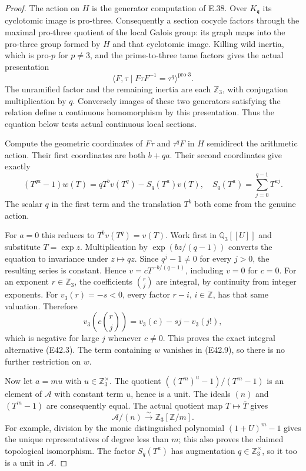 \begin{proof}
The action on $H$ is the generator computation of E.38.
Over $K_{\mathfrak q}$ its cyclotomic image is pro-three.
Consequently a section cocycle factors through the maximal
pro-three quotient of the local Galois group: its graph
maps into the pro-three group formed by $H$ and that
cyclotomic image. Killing wild inertia, which is pro-$p$
for $p\ne3$, and the prime-to-three tame factors gives
the actual presentation
\[
 \langle F,\tau\mid F\tau F^{-1}=\tau^q\rangle^{\mathrm{pro}\text{-}3}.
 \tag{E42.8}
\]
The unramified factor and the remaining inertia are each
$\mathbb Z_3$, with conjugation multiplication by $q$.
Conversely images of these two generators satisfying
the relation define a continuous homomorphism by this
presentation. Thus the equation below tests actual
continuous local sections.

Compute the geometric coordinates of $F\tau$ and
$\tau^qF$ in $H$ semidirect the arithmetic action.
Their first coordinates are both $b+qa$. Their second
coordinates give exactly
\[
 (T^{qa}-1)w(T)=qT^bv(T^q)-S_q(T^a)v(T),
 \quad S_q(T^a)=\sum_{j=0}^{q-1}T^{aj}.
 \tag{E42.9}
\]
The scalar $q$ in the first term and the translation
$T^b$ both come from the genuine action.

For $a=0$ this reduces to $T^bv(T^q)=v(T)$.
Work first in $\mathbb Q_3[[U]]$ and substitute
$T=\exp z$. Multiplication by
$\exp(bz/(q-1))$ converts the equation to invariance
under $z\mapsto qz$. Since $q^j-1\ne0$ for every
$j>0$, the resulting series is constant. Hence
$v=cT^{-b/(q-1)}$, including $v=0$ for $c=0$.
For an exponent $r\in\mathbb Z_3$, the coefficients
$\binom rj$ are integral, by continuity from integer
exponents. For $v_3(r)=-s<0$, every factor $r-i$,
$i\in\mathbb Z$, has that same valuation. Therefore
\[
 v_3\!\left(c\binom rj\right)
             =v_3(c)-sj-v_3(j!),
 \tag{E42.10}
\]
which is negative for large $j$ whenever $c\ne0$.
This proves the exact integral alternative (E42.3).
The term containing $w$ vanishes in (E42.9), so
there is no further restriction on $w$.

Now let $a=mu$ with $u\in\mathbb Z_3^\times$. The
quotient
$((T^m)^u-1)/(T^m-1)$ is an element of $\mathscr A$
with constant term $u$, hence is a unit. The ideals
$(n)$ and $(T^m-1)$ are consequently equal. The
actual quotient map $T\mapsto\overline T$ gives
\[
 \mathscr A/(n)\xrightarrow{\sim}
              \mathbb Z_3[\mathbb Z/m].
 \tag{E42.11}
\]
For example, division by the monic distinguished
polynomial $(1+U)^m-1$ gives the unique representatives
of degree less than $m$; this also proves the claimed
topological isomorphism. The factor $S_q(T^a)$ has
augmentation $q\in\mathbb Z_3^\times$, so it too
is a unit in $\mathscr A$.


\end{proof}
